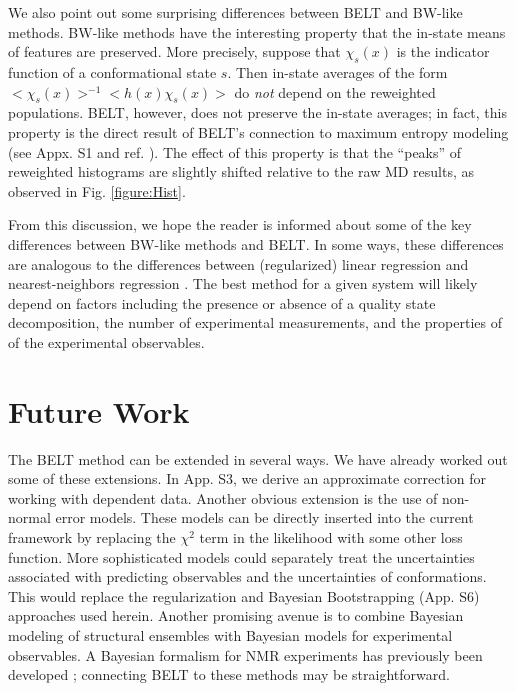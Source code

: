\documentclass[11pt,titlepage]{article}
\begin{document}
We also point out some surprising differences between BELT and BW-like methods.  BW-like methods have the interesting property that the in-state means of features are preserved.  More precisely, suppose that $\chi_s(x)$ is the indicator function of a conformational state $s$.  Then in-state averages of the form $<\chi_s(x)>^{-1} <h(x) \chi_s(x)>$ do \emph{not} depend on the reweighted populations.  BELT, however, does not preserve the in-state averages; in fact, this property is the direct result of BELT's connection to maximum entropy modeling (see Appx. S1 and ref.  \citep{chodera2012}).  The effect of this property is that the ``peaks'' of reweighted histograms are slightly shifted relative to the raw MD results, as observed in Fig. \ref{figure:Hist}.   

From this discussion, we hope the reader is informed about some of the key differences between BW-like methods and BELT.  In some ways, these differences are analogous to the differences between (regularized) linear regression and nearest-neighbors regression \cite{friedman2001elements}.  The best method for a given system will likely depend on factors including the presence or absence of a quality state decomposition, the number of experimental measurements, and the properties of of the experimental observables.  


\section*{Future Work}

The BELT method can be extended in several ways.  We have already worked out some of these extensions.  In App. S3, we derive an approximate correction for working with dependent data.  Another obvious extension is the use of non-normal error models.  These models can be directly inserted into the current framework by replacing the $\chi^2$ term in the likelihood with some other loss function.  More sophisticated models could separately treat the uncertainties associated with predicting observables and the uncertainties of conformations.  This would replace the regularization and Bayesian Bootstrapping (App. S6) approaches used herein.  Another promising avenue is to combine Bayesian modeling of structural ensembles with Bayesian models for experimental observables.  A Bayesian formalism for NMR experiments has previously been developed  \citep{rieping2005, habeck2006, habeck2005bayesian}; connecting BELT to these methods may be straightforward.  
\end{document}
